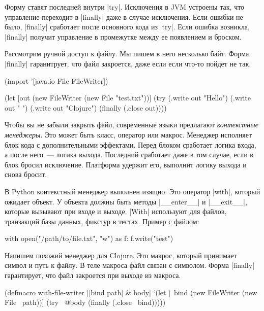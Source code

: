 Форму ставят последней внутри \spverb|try|. Исключения в JVM устроены так, что
управление переходит в \spverb|finally| даже в случае исключения. Если ошибки не
было, \spverb|finally| сработает после основного кода из \spverb|try|. Если
ошибка возникла, \spverb|finally| получит управление в промежутке между ее
появлением и броском.

Рассмотрим ручной доступ к файлу. Мы пишем в него несколько байт. Форма
\spverb|finally| гаранитрует, что файл закроется, даже если если что-то пойдет
не так.

\begin{english}
  \begin{clojure}
(import '[java.io File FileWriter])

(let [out (new FileWriter (new File "test.txt"))]
  (try
    (.write out "Hello")
    (.write out " ")
    (.write out "Clojure")
    (finally
      (.close out))))
  \end{clojure}
\end{english}

Чтобы вы не забыли закрыть файл, современные языки предлагают \emph{контекстные
  менеджеры}. Это может быть класс, оператор или макрос. Менеджер исполняет блок
кода с дополнительными эффектами. Перед блоком сработает логика входа, а после
него~--- логика выхода. Последний сработает даже в том случае, если в блок
бросил исключение. Платформа удержит его, выполнит логику выхода и снова бросит.

В Python контекстный менеджер выполнен изящно. Это оператор \spverb|with|,
который ожидает объект. У объекта должны быть методы \spverb|__enter__| и
\spverb|__exit__|, которые вызывают при входе и выходе. \spverb|With| используют
для файлов, транзакций базы данных, фикстур в тестах. Пример с файлом:

\begin{english}
  \begin{python}
with open("/path/to/file.txt", "w") as f:
    f.write("test")
  \end{python}
\end{english}

Напишем похожий менеджер для Clojure. Это макрос, который принимает символ и
путь к файлу. В теле макроса файл связан с символом. Форма \spverb|finally|
гарантирует, что файл закроется при выходе из макроса.

\begin{english}
  \begin{clojure}
(defmacro with-file-writer
  [[bind path] & body]
  `(let [~bind (new FileWriter (new File ~path))]
     (try
       ~@body
       (finally
         (.close ~bind)))))
  \end{clojure}
\end{english}


